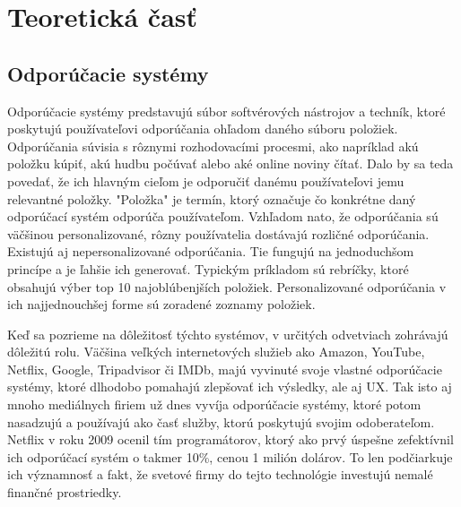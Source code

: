 \section{Teoretická časť}

\subsection{Odporúčacie systémy}
 Odporúčacie systémy predstavujú súbor softvérových nástrojov a techník, ktoré poskytujú používateľovi odporúčania ohľadom daného súboru položiek. Odporúčania súvisia s rôznymi rozhodovacími procesmi, ako napríklad akú položku kúpiť, akú hudbu počúvať alebo aké online noviny  čítať. \cite{rs1} Dalo by sa teda povedať, že ich hlavným cieľom je odporučiť danému používateľovi jemu relevantné položky. "Položka" je termín, ktorý označuje čo konkrétne daný odporúčací systém odporúča používateľom. Vzhľadom nato, že odporúčania sú väčšinou personalizované, rôzny používatelia dostávajú rozličné odporúčania. Existujú aj nepersonalizované odporúčania. Tie fungujú na jednoduchšom princípe a je ľahšie ich generovať. Typickým príkladom sú rebríčky, ktoré obsahujú výber top 10 najoblúbenjších položiek. Personalizované odporúčania v ich najjednouchšej forme sú zoradené zoznamy položiek.
 
Keď sa pozrieme na dôležitosť týchto systémov, v určitých odvetviach zohrávajú dôležitú rolu. Väčšina veľkých internetových služieb ako Amazon, YouTube, Netflix, Google, Tripadvisor či IMDb, majú vyvinuté svoje vlastné odporúčacie systémy, ktoré dlhodobo pomahajú zlepšovať ich výsledky, ale aj UX. Tak isto aj mnoho mediálnych firiem už dnes vyvíja odporúčacie systémy, ktoré potom nasadzujú a používajú ako časť služby, ktorú poskytujú svojim odoberateľom. Netflix v roku 2009 ocenil tím programátorov, ktorý ako prvý úspešne zefektívnil ich odporúčací systém o takmer 10\%, cenou 1 milión dolárov. To len podčiarkuje ich významnosť a fakt, že svetové firmy do tejto technológie investujú nemalé finančné prostriedky.  \\

